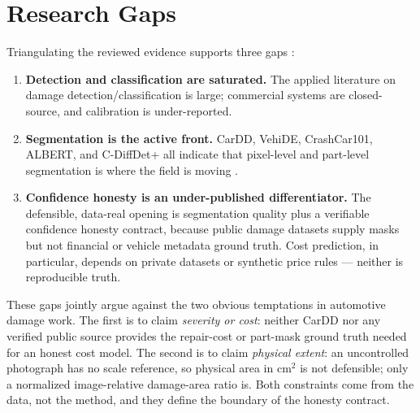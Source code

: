 \documentclass[conference]{IEEEtran}
\begin{document}
\section{Research Gaps}
\label{sec:gaps}
Triangulating the reviewed evidence supports three gaps \cite{hasan2025,cardd2023,
vehide2023,albert2025}:
\begin{enumerate}
  \item \textbf{Detection and classification are saturated.} The applied
  literature on damage detection/classification is large; commercial systems are
  closed-source, and calibration is under-reported.
  \item \textbf{Segmentation is the active front.} CarDD, VehiDE, CrashCar101,
  ALBERT, and C-DiffDet+ all indicate that pixel-level and part-level
  segmentation is where the field is moving \cite{cardd2023,vehide2023,
  crashcar101,albert2025,cdiffdet2025}.
  \item \textbf{Confidence honesty is an under-published differentiator.} The
  defensible, data-real opening is segmentation quality plus a verifiable
  confidence honesty contract, because public damage datasets supply masks but
  not financial or vehicle metadata ground truth. Cost prediction, in
  particular, depends on private datasets or synthetic price rules --- neither is
  reproducible truth.
\end{enumerate}
These gaps jointly argue against the two obvious temptations in automotive
damage work. The first is to claim \emph{severity or cost}: neither CarDD nor
any verified public source provides the repair-cost or part-mask ground truth
needed for an honest cost model. The second is to claim \emph{physical extent}:
an uncontrolled photograph has no scale reference, so physical area in
cm$^{2}$ is not defensible; only a normalized image-relative damage-area ratio
is. Both constraints come from the data, not the method, and they define the
boundary of the honesty contract.
\end{document}
